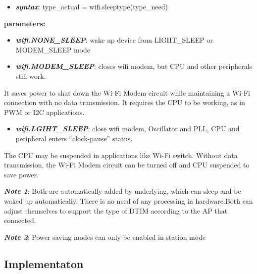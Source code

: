 \documentclass[16pt]{article}
\begin{document}
\begin{itemize}

\item
  \textbf{\emph{syntax}}: type\_actual = wifi.sleeptype(type\_need)
\end{itemize}

  \textbf{parameters:}

\begin{itemize}
\item
  \textbf{\emph{wifi.NONE\_SLEEP}}: wake up device from LIGHT\_SLEEP or MODEM\_SLEEP
  mode
\item
  \textbf{\emph{wifi.MODEM\_SLEEP}}: closes wifi modem, but CPU and other peripherals
  still work.
\end{itemize}

It saves power to shut down the Wi-Fi Modem circuit while maintaining a
Wi-Fi connection with no data transmission. It requires the CPU to be
working, as in PWM or I2C applications.

\begin{itemize}

\item
  \textbf{\emph{wifi.LGIHT\_SLEEP}}: close wifi modem, Oscillator and PLL, CPU and
  peripheral enters ``clock-pause'' status.
\end{itemize}

The CPU may be suspended in applications like Wi-Fi switch. Without data
transmission, the Wi-Fi Modem circuit can be turned off and CPU
suspended to save power.

\vspace{0.2cm}

\textbf{\emph{Note 1}}: Both are automatically added by underlying, which
can sleep and be waked up automatically. There is no need of any
processing in hardware.Both can adjust themselves to support the type of
DTIM according to the AP that connected.

\vspace{0.1cm}

\textbf{\emph{Note 2}}: Power saving modes can only be enabled in station
mode

\vspace{0.6cm}

\subsection{Implementaton}

\vspace{0.3cm}
\end{document}

